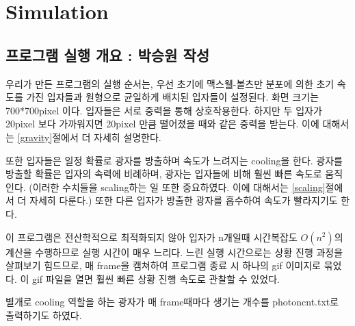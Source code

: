 \documentclass{gshs-hutech}
\begin{document}
\begin{abstract}
우리는 천문학 수업시간에 배운 Hierarchical fragmentation을 직접 프로그래밍을 통해 구현하고자 하였다.

사용한 언어는 Processing이며, 이는 C언어에 비해 물리적 현상의 시각화에 유리하다.

물론 기존에도 Hierarchical fragmentation을 구현한 논문[\ref{bib1}]이 많았지만, 우리는 기존의 것에 비하여 알고리즘의 복잡성을 배제함과 동시에 coolant의 역할을 중요하게 여겨 coolant가 있을때와 없을 때를 서로 비교한 결과, coolant가 있을 때 Hierarchical fragmentation이 더 잘 일어남을 관찰할 수 있었다.

※This document is written with {\LaTeX}, and satisfies 삼성휴먼테크논문대회 requirements
(except the information of authors written above.)

\end{abstract}

\clearpage

\chapter{Simulation}
\section{프로그램 실행 개요 : 박승원 작성}
우리가 만든 프로그램의 실행 순서는, 우선 초기에 맥스웰-볼츠만 분포에 의한 초기 속도를 가진 입자들과 원형으로 균일하게 배치된 입자들이 설정된다. 화면 크기는 700*700pixel 이다. 
입자들은 서로 중력을 통해 상호작용한다. 하지만 두 입자가 20pixel 보다 가까워지면 20pixel 만큼 떨어졌을 때와 같은 중력을 받는다. 이에 대해서는 \ref{gravity}절에서 더 자세히 설명한다.

또한 입자들은 일정 확률로 광자를 방출하며 속도가 느려지는 cooling을 한다. 광자를 방출할 확률은 입자의 속력에 비례하며, 광자는 입자들에 비해 훨씬 빠른 속도로 움직인다. (이러한 수치들을 scaling하는 일 또한 중요하였다. 이에 대해서는 \ref{scaling}절에서 더 자세히 다룬다.) 또한 다른 입자가 방출한 광자를 흡수하여 속도가 빨라지기도 한다.

이 프로그램은 전산학적으로 최적화되지 않아 입자가 n개일때 시간복잡도 $O(n^2)$의 계산을 수행하므로 실행 시간이 매우 느리다. 느린 실행 시간으로는 상황 진행 과정을 살펴보기 힘드므로, 매 frame을 캠쳐하여 프로그램 종료 시 하나의 gif 이미지로 묶었다. 이 gif 파일을 열면 훨씬 빠른 상황 진행 속도로 관찰할 수 있었다.

별개로 cooling 역할을 하는 광자가 매 frame때마다 생기는 개수를 photoncnt.txt로 출력하기도 하였다. 
\end{document}
